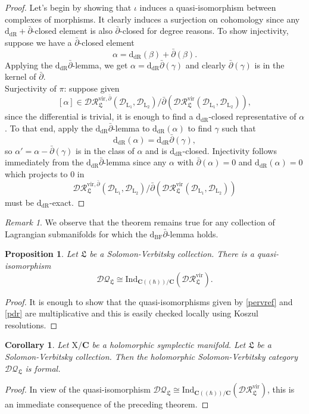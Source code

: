 \documentclass{article}
\theoremstyle{plain}
\newtheorem{corollary}[theorem]{Corollary}
\newtheorem{proposition}[theorem]{Proposition}
\theoremstyle{definition}
\theoremstyle{remark}
\newtheorem{remark}[theorem]{Remark}
\newcommand{\mr}{\mathrm}
\newcommand{\C}{\mathbf C}
\newcommand{\cbrak}{(\!(\hbar)\!)}
\newcommand{\3}{\vspace{3mm}}
\newcommand{\2}{\vspace{2mm}}
\newcommand{\1}{\vspace{1mm}}
\begin{document}
\begin{proof}
Let's begin by showing that $\iota$ induces a quasi-isomorphism between complexes of morphisms. It clearly induces a surjection on cohomology since any $\mr{d_{dR}}+\bar{\partial}$-closed element is also $\bar{\partial}$-closed for degree reasons. To show injectivity, suppose we have a $\bar{\partial}$-closed element $$\alpha= \mr{d_{dR}}(\beta)+\bar{\partial}(\beta).$$ Applying the $\mr{d_{dR}}\bar{\partial}$-lemma, we get $\alpha= \mr{d_{dR}}\bar{\partial}(\gamma)$ and clearly $\bar{\partial}(\gamma)$ is in the kernel of $\bar{\partial}$. \\
Surjectivity of $\pi$: suppose given $$[\alpha] \in \mathcal{DR}_\mathfrak{L}^{\mr{vir},\bar{\partial}}\left(\mathscr{D}_{\mr{L}_1},\mathscr{D}_{\mr{L}_2}\right)/\bar{\partial}\left(\mathcal{DR}^{\mr{vir}}_\mathfrak{L}\left(\mathscr{D}_{\mr{L}_1},\mathscr{D}_{\mr{L}_2}\right)\right),$$ since the differential is trivial, it is enough to find a $\mr{d_{dR}}$-closed representative of $\alpha$. To that end, apply the $\mr{d_{dR}}\bar{\partial}$-lemma to $\mr{d_{dR}}(\alpha)$ to find $\gamma$ such that $$\mr{d_{dR}}(\alpha)=\mr{d_{dR}}\bar{\partial}(\gamma),$$ so $\alpha'=\alpha-\bar{\partial}(\gamma)$ is in the class of $\alpha$ and is $\mr{d_{dR}}$-closed. Injectivity follows immediately from the $\mr{d_{dR}}\bar{\partial}$-lemma since any $\alpha$ with $\bar{\partial}(\alpha)=0$ and $\mr{d_{dR}}(\alpha)=0$ which projects to $0$ in $$\mathcal{DR}_\mathfrak{L}^{\mr{vir},\bar{\partial}}\left(\mathscr{D}_{\mr{L}_1},\mathscr{D}_{\mr{L}_2}\right)/\bar{\partial}\left(\mathcal{DR}^{\mr{vir}}_\mathfrak{L}\left(\mathscr{D}_{\mr{L}_1},\mathscr{D}_{\mr{L}_2}\right)\right)$$ must be $\mr{d_{dR}}$-exact.
\end{proof}
\2
\begin{remark}
We observe that the theorem remains true for any collection of Lagrangian submanifolds for which the $\mr{d}_\mr{BF}\bar{\partial}$-lemma holds.
\end{remark}
\2
\begin{proposition}\label{dqdr}
Let $\mathfrak{L}$ be a Solomon-Verbitsky collection. There is a quasi-isomorphism $$\mathcal{DQ}_\mathfrak{L}\cong \mr{Ind}_{\C\cbrak/\C}\left(\mathcal{DR}^{\mr{vir}}_\mathfrak{L}\right).$$
\end{proposition} 
\begin{proof}
It is enough to show that the quasi-isomorphisms given by \cref{pervref} and \cref{pdr} are multiplicative and this is easily checked locally using Koszul resolutions.
\end{proof}
\2
\begin{corollary}\label{lags}
Let $\mr{X}/\C$ be a holomorphic symplectic manifold. Let $\mathfrak{L}$ be a Solomon-Verbitsky collection. Then the holomorphic Solomon-Verbitsky category $\mathcal{DQ}_\mathfrak{L}$ is formal.
\end{corollary}
\begin{proof}
In view of the quasi-isomorphism $\mathcal{DQ}_\mathfrak{L}\cong \mr{Ind}_{\C\cbrak/\C}\left(\mathcal{DR}^{\mr{vir}}_\mathfrak{L}\right)$, this is an immediate consequence of the preceding theorem.
\end{proof}
\end{document}
